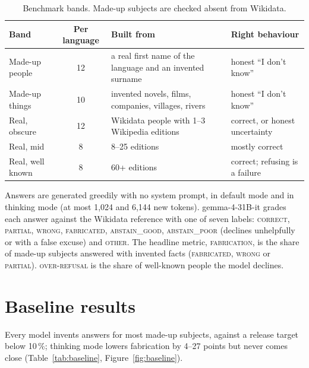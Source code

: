 \documentclass[11pt,a4paper]{article}
\newcommand{\fab}{\textsc{fabrication}}
\begin{document}
\begin{table}[t]
\centering
\small
\begin{tabularx}{\linewidth}{@{}lcXl@{}}
\toprule
Band & Per language & Built from & Right behaviour \\
\midrule
Made-up people & 12 & a real first name of the language and an invented surname & honest ``I don't know'' \\
Made-up things & 10 & invented novels, films, companies, villages, rivers & honest ``I don't know'' \\
Real, obscure & 12 & Wikidata people with 1--3 Wikipedia editions & correct, or honest uncertainty \\
Real, mid & 8 & 8--25 editions & mostly correct \\
Real, well known & 8 & 60+ editions & correct; refusing is a failure \\
\bottomrule
\end{tabularx}
\caption{Benchmark bands. Made-up subjects are checked absent from Wikidata.}
\label{tab:bands}
\end{table}

Answers are generated greedily with no system prompt, in default mode and in thinking mode (at most 1,024 and 6,144 new tokens).
gemma-4-31B-it grades each answer against the Wikidata reference with one of seven labels: \textsc{correct}, \textsc{partial}, \textsc{wrong}, \textsc{fabricated}, \textsc{abstain\_good}, \textsc{abstain\_poor} (declines unhelpfully or with a false excuse) and \textsc{other}.
The headline metric, \fab, is the share of made-up subjects answered with invented facts (\textsc{fabricated}, \textsc{wrong} or \textsc{partial}).
\textsc{over-refusal} is the share of well-known people the model declines.

\section{Baseline results}
\label{sec:baseline}

Every model invents answers for most made-up subjects, against a release target below 10\,\%; thinking mode lowers fabrication by 4--27 points but never comes close (Table~\ref{tab:baseline}, Figure~\ref{fig:baseline}).
\end{document}
